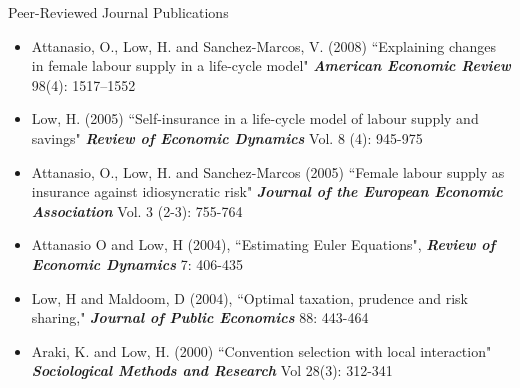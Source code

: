 \documentclass{resume} %
\begin{document}
\begin{rSection}{Peer-Reviewed Journal Publications}
\begin{itemize}
\item Attanasio, O., Low, H. and Sanchez-Marcos, V. (2008) ``Explaining changes in female labour supply in a life-cycle model" \textit{\textbf{American Economic Review}}  98(4): 1517--1552
\item Low, H. (2005) ``Self-insurance in a life-cycle model of labour supply and savings" \textit{\textbf{Review of Economic Dynamics}} Vol. 8 (4): 945-975 
\item Attanasio, O., Low, H. and Sanchez-Marcos (2005) ``Female labour supply as insurance against idiosyncratic risk" \textit{\textbf{Journal of the European Economic Association}} Vol. 3 (2-3): 755-764
\item Attanasio O and Low, H (2004), ``Estimating Euler Equations", \textit{\textbf{Review of Economic Dynamics}} 7: 406-435 
\item Low, H and Maldoom, D (2004), ``Optimal taxation, prudence and risk sharing," \textit{\textbf{Journal of Public Economics}} 88: 443-464 
\item Araki, K. and Low, H. (2000) ``Convention selection with local interaction" \textit{\textbf{Sociological Methods and Research}} Vol 28(3): 312-341

\end{itemize}
\end{rSection}
\end{document}
